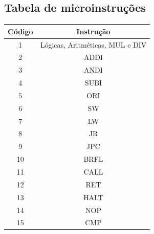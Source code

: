     		\subsection{Tabela de microinstruções}

	\begin{center}
		\begin{longtable}[pos]{| c | c |} \hline
			\multicolumn{1}{|c|}{\cellcolor[gray]{0.9}\textbf{Código}} & 
			\multicolumn{1}{c|}{\cellcolor[gray]{0.9}\textbf{Instrução}} \\ \hline 
			\endhead
			\hline
			\endlastfoot
			
	    	1 & Lógicas, Aritméticas, MUL e DIV\\ \hline
            2 & ADDI \\ \hline
            3 & ANDI \\ \hline
            4 & SUBI \\ \hline
            5 & ORI \\ \hline
            6 & SW \\ \hline
            7 & LW \\ \hline
            8 & JR\\ \hline
            9 & JPC\\ \hline
            10 & BRFL\\ \hline
            11 & CALL\\ \hline
            12 & RET\\ \hline
            13 & HALT\\ \hline
            14 & NOP\\ \hline
            15 & CMP\\ \hline
		\end{longtable}
	\end{center}

